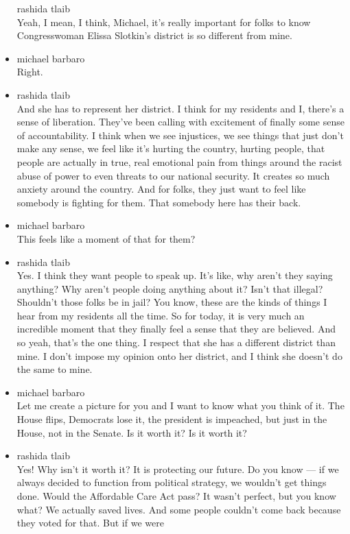 \begin{itemize}
  rashida tlaib\\
  Yeah, I mean, I think, Michael, it's really important for folks to
  know Congresswoman Elissa Slotkin's district is so different from
  mine.
\item
  michael barbaro\\
  Right.
\item
  rashida tlaib\\
  And she has to represent her district. I think for my residents and I,
  there's a sense of liberation. They've been calling with excitement of
  finally some sense of accountability. I think when we see injustices,
  we see things that just don't make any sense, we feel like it's
  hurting the country, hurting people, that people are actually in true,
  real emotional pain from things around the racist abuse of power to
  even threats to our national security. It creates so much anxiety
  around the country. And for folks, they just want to feel like
  somebody is fighting for them. That somebody here has their back.
\item
  michael barbaro\\
  This feels like a moment of that for them?
\item
  rashida tlaib\\
  Yes. I think they want people to speak up. It's like, why aren't they
  saying anything? Why aren't people doing anything about it? Isn't that
  illegal? Shouldn't those folks be in jail? You know, these are the
  kinds of things I hear from my residents all the time. So for today,
  it is very much an incredible moment that they finally feel a sense
  that they are believed. And so yeah, that's the one thing. I respect
  that she has a different district than mine. I don't impose my opinion
  onto her district, and I think she doesn't do the same to mine.
\item
  michael barbaro\\
  Let me create a picture for you and I want to know what you think of
  it. The House flips, Democrats lose it, the president is impeached,
  but just in the House, not in the Senate. Is it worth it? Is it worth
  it?
\item
  rashida tlaib\\
  Yes! Why isn't it worth it? It is protecting our future. Do you know
  --- if we always decided to function from political strategy, we
  wouldn't get things done. Would the Affordable Care Act pass? It
  wasn't perfect, but you know what? We actually saved lives. And some
  people couldn't come back because they voted for that. But if we were

\end{itemize}
